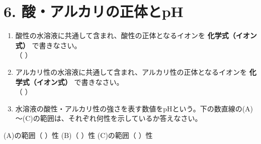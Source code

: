 \section*{6. 酸・アルカリの正体とpH}
\begin{enumerate}
    \item 酸性の水溶液に共通して含まれ、酸性の正体となるイオンを \textbf{化学式（イオン式）} で書きなさい。\\[0.2cm]
    （ \hspace{5cm} ）
    \item アルカリ性の水溶液に共通して含まれ、アルカリ性の正体となるイオンを \textbf{化学式（イオン式）} で書きなさい。\\[0.2cm]
    （ \hspace{5cm} ）
    \item 水溶液の酸性・アルカリ性の強さを表す数値をpHという。下の数直線の(A)～(C)の範囲は、それぞれ何性を示しているか答えなさい。
\end{enumerate}

\begin{center}
\end{center}
\vspace{0.3cm}
\begin{flushright}
(A)の範囲（ \hspace{3cm} ）性 \hspace{0.5cm} (B)（ \hspace{3cm} ）性 \hspace{0.5cm} (C)の範囲（ \hspace{3cm} ）性
\end{flushright}

